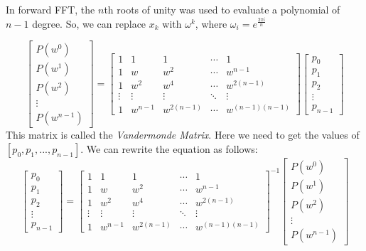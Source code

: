 \documentclass{report}
\begin{document}
In forward FFT, the $n$th roots of unity was used to evaluate a polynomial of $n-1$ degree. So, we can replace $x_k$ with $\omega^k$, where $\omega_i = e^{\frac{2\pi i}{n}}$

\begin{equation*}
  \begin{bmatrix}
    P(w^0) \\
    P(w^1) \\
    P(w^2) \\
    \vdots \\
    P(w^{n-1})
  \end{bmatrix} 
    = 
    \begin{bmatrix} 
      1     & 1     & 1     & \cdots & 1    \\ 
      1     & w     & w^2   & \cdots & w^{n-1} \\ 
      1     & w^2   & w^4   & \cdots & w^{2(n-1)} \\
      \vdots & \vdots & \vdots  & \ddots & \vdots \\
      1 & w^{n-1} & w^{2(n-1)}  & \cdots & w^{(n-1)(n-1)} 
    \end{bmatrix} 
    \begin{bmatrix}
        p_0 \\
        p_1 \\
        p_2 \\
        \vdots \\
        p_{n-1}
    \end{bmatrix}
\end{equation*}
This matrix is called the \textit{Vandermonde Matrix}.
Here we need to get the values of $[p_0, p_1, ... , p_{n-1}]$. We can rewrite the equation as follows:
\begin{equation*}
    \begin{bmatrix}
        p_0 \\
        p_1 \\
        p_2 \\
        \vdots \\
        p_{n-1}
    \end{bmatrix}
    = 
    {\begin{bmatrix} 
      1     & 1     & 1     & \cdots & 1    \\ 
      1     & w     & w^2   & \cdots & w^{n-1} \\ 
      1     & w^2   & w^4   & \cdots & w^{2(n-1)} \\
      \vdots & \vdots & \vdots  & \ddots & \vdots \\
      1 & w^{n-1} & w^{2(n-1)}  & \cdots & w^{(n-1)(n-1)} 
    \end{bmatrix} }^{-1}
    \begin{bmatrix}
    P(w^0) \\
    P(w^1) \\
    P(w^2) \\
    \vdots \\
    P(w^{n-1})
  \end{bmatrix}     
\end{equation*}
\end{document}
